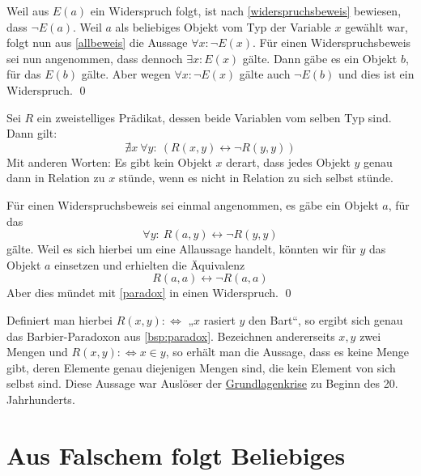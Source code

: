 \begin{bew}
    Weil aus $E(a)$ ein Widerspruch folgt, ist nach \cref{widerspruchsbeweis} bewiesen, dass $\neg E(a)$. Weil $a$ als beliebiges Objekt vom Typ der Variable $x$ gewählt war, folgt nun aus \cref{allbeweis} die Aussage $\forall x: \neg E(x)$. Für einen Widerspruchsbeweis sei nun angenommen, dass dennoch $\exists x: E(x)$ gälte. Dann gäbe es ein Objekt $b$, für das $E(b)$ gälte. Aber wegen $\forall x: \neg E(x)$ gälte auch $\neg E(b)$ und dies ist ein Widerspruch. \qed
\end{bew}


\begin{satz} \label{russell} 
    Sei $R$ ein zweistelliges Prädikat, dessen beide Variablen vom selben Typ sind. Dann gilt:
        \[ \nexists x\ \forall y:\ (R(x,y) \leftrightarrow \neg R(y,y))\]
    Mit anderen Worten: Es gibt kein Objekt $x$ derart, dass jedes Objekt $y$ genau dann in Relation zu $x$ stünde, wenn es nicht in Relation zu sich selbst stünde.
\end{satz}


\begin{bew}
    Für einen Widerspruchsbeweis sei einmal angenommen, es gäbe ein Objekt $a$, für das
        \[ \forall y:\ R(a,y) \leftrightarrow \neg R(y,y) \]
    gälte. Weil es sich hierbei um eine Allaussage handelt, könnten wir für $y$ das Objekt $a$ einsetzen und erhielten die Äquivalenz
        \[ R(a,a) \leftrightarrow \neg R(a,a) \]
    Aber dies mündet mit \cref{paradox} in einen Widerspruch. \qed
\end{bew}
 

\begin{vorschau}[*]
    Definiert man hierbei $R(x,y):\Leftrightarrow$ „$x$ rasiert $y$ den Bart“, so ergibt sich genau das Barbier-Paradoxon aus \cref{bsp:paradox}. Bezeichnen andererseits $x,y$ zwei Mengen und $R(x,y):\Leftrightarrow x\in y$, so erhält man die Aussage, dass es keine Menge gibt, deren Elemente genau diejenigen Mengen sind, die kein Element von sich selbst sind. Diese Aussage war Auslöser der \href{https://de.wikipedia.org/wiki/Grundlagenkrise_der_Mathematik}{Grundlagenkrise} zu Beginn des 20. Jahrhunderts.
\end{vorschau}
  
  

  
    
\section{Aus Falschem folgt Beliebiges}


